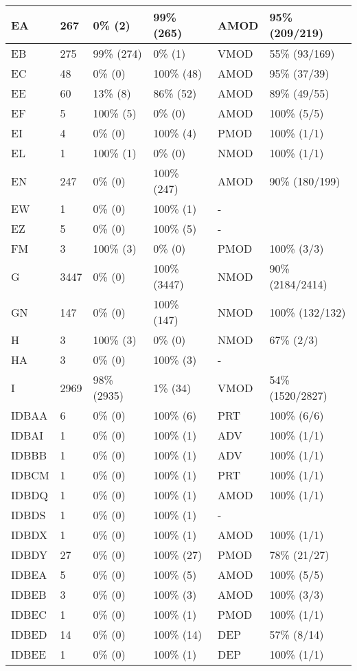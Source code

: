 \begin{figure*}
\begin{tabular}{|l|l|l|l||l|l|}
\hline
 EA & 267 & 0\% (2) & 99\% (265) & AMOD & 95\% (209/219) \\ 
\hline
 EB & 275 & 99\% (274) & 0\% (1) & VMOD & 55\% (93/169) \\ 
\hline
 EC & 48 & 0\% (0) & 100\% (48) & AMOD & 95\% (37/39) \\ 
\hline
 EE & 60 & 13\% (8) & 86\% (52) & AMOD & 89\% (49/55) \\ 
\hline
 EF & 5 & 100\% (5) & 0\% (0) & AMOD & 100\% (5/5) \\ 
\hline
 EI & 4 & 0\% (0) & 100\% (4) & PMOD & 100\% (1/1) \\ 
\hline
 EL & 1 & 100\% (1) & 0\% (0) & NMOD & 100\% (1/1) \\ 
\hline
 EN & 247 & 0\% (0) & 100\% (247) & AMOD & 90\% (180/199) \\ 
\hline
 EW & 1 & 0\% (0) & 100\% (1) & - &  \\ 
\hline
 EZ & 5 & 0\% (0) & 100\% (5) & - &  \\ 
\hline
 FM & 3 & 100\% (3) & 0\% (0) & PMOD & 100\% (3/3) \\ 
\hline
 G & 3447 & 0\% (0) & 100\% (3447) & NMOD & 90\% (2184/2414) \\ 
\hline
 GN & 147 & 0\% (0) & 100\% (147) & NMOD & 100\% (132/132) \\ 
\hline
 H & 3 & 100\% (3) & 0\% (0) & NMOD & 67\% (2/3) \\ 
\hline
 HA & 3 & 0\% (0) & 100\% (3) & - &  \\ 
\hline
 I & 2969 & 98\% (2935) & 1\% (34) & VMOD & 54\% (1520/2827) \\ 
\hline
 IDBAA & 6 & 0\% (0) & 100\% (6) & PRT & 100\% (6/6) \\ 
\hline
 IDBAI & 1 & 0\% (0) & 100\% (1) & ADV & 100\% (1/1) \\ 
\hline
 IDBBB & 1 & 0\% (0) & 100\% (1) & ADV & 100\% (1/1) \\ 
\hline
 IDBCM & 1 & 0\% (0) & 100\% (1) & PRT & 100\% (1/1) \\ 
\hline
 IDBDQ & 1 & 0\% (0) & 100\% (1) & AMOD & 100\% (1/1) \\ 
\hline
 IDBDS & 1 & 0\% (0) & 100\% (1) & - &  \\ 
\hline
 IDBDX & 1 & 0\% (0) & 100\% (1) & AMOD & 100\% (1/1) \\ 
\hline
 IDBDY & 27 & 0\% (0) & 100\% (27) & PMOD & 78\% (21/27) \\ 
\hline
 IDBEA & 5 & 0\% (0) & 100\% (5) & AMOD & 100\% (5/5) \\ 
\hline
 IDBEB & 3 & 0\% (0) & 100\% (3) & AMOD & 100\% (3/3) \\ 
\hline
 IDBEC & 1 & 0\% (0) & 100\% (1) & PMOD & 100\% (1/1) \\ 
\hline
 IDBED & 14 & 0\% (0) & 100\% (14) & DEP & 57\% (8/14) \\ 
\hline
 IDBEE & 1 & 0\% (0) & 100\% (1) & DEP & 100\% (1/1) \\ 
\hline
\end{tabular}
\end{figure*}
